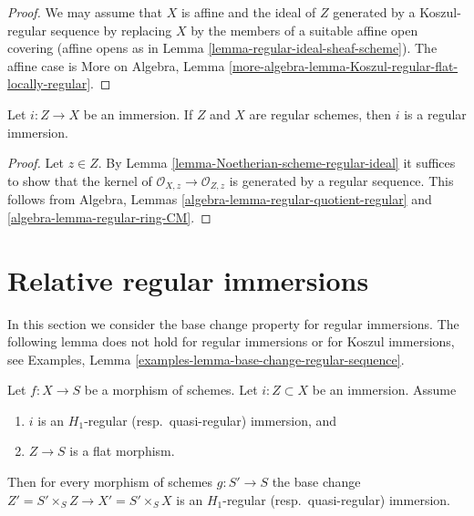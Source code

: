 \begin{proof}
We may assume that $X$ is affine and the ideal of $Z$ generated by
a Koszul-regular sequence by replacing $X$ by the members of a suitable
affine open covering (affine opens as in
Lemma \ref{lemma-regular-ideal-sheaf-scheme}).
The affine case is
More on Algebra,
Lemma \ref{more-algebra-lemma-Koszul-regular-flat-locally-regular}.
\end{proof}

\begin{lemma}
\label{lemma-immersion-regular-regular-immersion}
Let $i : Z \to X$ be an immersion. If $Z$ and $X$ are
regular schemes, then $i$ is a regular immersion.
\end{lemma}

\begin{proof}
Let $z \in Z$. By Lemma \ref{lemma-Noetherian-scheme-regular-ideal}
it suffices to show that the kernel of
$\mathcal{O}_{X, z} \to \mathcal{O}_{Z, z}$
is generated by a regular sequence. This follows from
Algebra, Lemmas \ref{algebra-lemma-regular-quotient-regular} and
\ref{algebra-lemma-regular-ring-CM}.
\end{proof}





\section{Relative regular immersions}
\label{section-relative-regular-immersion}

\noindent
In this section we consider the base change property for regular immersions.
The following lemma does not hold for regular immersions
or for Koszul immersions, see
Examples, Lemma \ref{examples-lemma-base-change-regular-sequence}.

\begin{lemma}
\label{lemma-relative-regular-immersion}
Let $f : X \to S$ be a morphism of schemes.
Let $i : Z \subset X$ be an immersion.
Assume
\begin{enumerate}
\item $i$ is an $H_1$-regular (resp.\ quasi-regular) immersion, and
\item $Z \to S$ is a flat morphism.
\end{enumerate}
Then for every morphism of schemes $g : S' \to S$ the base change
$Z' = S' \times_S Z \to X' = S' \times_S X$
is an $H_1$-regular (resp.\ quasi-regular) immersion.
\end{lemma}

